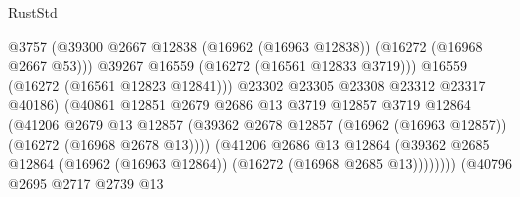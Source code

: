 \begin{lexlean}{RustStd}
\begin{coremodule}
                                              @3757
                                              (@39300
                                                @2667
                                                @12838
                                                (@16962 (@16963 @12838))
                                                (@16272 (@16968 @2667 @53)))
                                              @39267
                                              @16559
                                              (@16272 (@16561 @12833 @3719)))
                                            @16559
                                            (@16272 (@16561 @12823 @12841)))
                                          @23302
                                          @23305
                                          @23308
                                          @23312
                                          @23317
                                          @40186)
                                        (@40861
                                          @12851
                                          @2679
                                          @2686
                                          @13
                                          @3719
                                          @12857
                                          @3719
                                          @12864
                                          (@41206
                                            @2679
                                            @13
                                            @12857
                                            (@39362
                                              @2678
                                              @12857
                                              (@16962 (@16963 @12857))
                                              (@16272 (@16968 @2678 @13))))
                                          (@41206
                                            @2686
                                            @13
                                            @12864
                                            (@39362
                                              @2685
                                              @12864
                                              (@16962 (@16963 @12864))
                                              (@16272 (@16968 @2685 @13))))))))
                                  (@40796
                                    @2695
                                    @2717
                                    @2739
                                    @13

\end{coremodule}
\end{lexlean}
